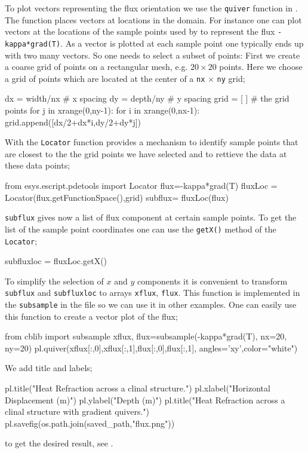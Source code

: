 To plot vectors representing the flux orientation we use the 
\verb|quiver| function in \pylab. The function places vectors at locations in the domain.
For instance one can plot vectors at the locations of the sample points used by \esc 
to represent the flux \verb|-kappa*grad(T)|. As a vector is plotted at each sample point one typically ends
up with two many vectors. So one needs to select a subset of points:
First we create a coarse grid of points on a rectangular mesh, e.g. $20 \times 20$ points. Here we choose a grid of points which are located at the center of a \verb|nx| $\times$ \verb|ny| grid;
\begin{python}
dx = width/nx # x spacing
dy = depth/ny # y spacing
grid = [ ] # the grid points
for j in xrange(0,ny-1):
    for i in xrange(0,nx-1):
           grid.append([dx/2+dx*i,dy/2+dy*j])
\end{python}
With the \verb|Locator|  function \esc provides a mechanism to identify sample points that are closest 
to the the grid points we have selected and to rettieve the data at these data points; 
\begin{python}
from esys.escript.pdetools import Locator
flux=-kappa*grad(T)
fluxLoc = Locator(flux.getFunctionSpace(),grid)
subflux= fluxLoc(flux) 
\end{python}
\verb|subflux| gives now a list of flux component at certain sample points. To get the 
list of the sample point coordinates one can use the \verb|getX()| method of the 
\verb|Locator|;
\begin{python}
subfluxloc = fluxLoc.getX()
\end{python}
To simplify the selection of $x$ and $y$ components it is convenient 
to transform \verb|subflux| and \verb|subfluxloc| to \numpy arrays
\verb|xflux|, \verb|flux|.
This function is implemented in the \verb|subsample| 
in the   file so we can use it in other examples. One can easily use this function 
to create a vector plot of the flux;
\begin{python}
from cblib import subsample
xflux, flux=subsample(-kappa*grad(T), nx=20, ny=20)
pl.quiver(xflux[:,0],xflux[:,1],flux[:,0],flux[:,1], angles='xy',color="white")
\end{python}
We add title and labels;
\begin{python}
pl.title("Heat Refraction across a clinal structure.")
pl.xlabel("Horizontal Displacement (m)")
pl.ylabel("Depth (m)")
pl.title("Heat Refraction across a clinal structure \n with gradient quivers.")
pl.savefig(os.path.join(saved_path,"flux.png"))
\end{python} 
to get the desired result, see .

